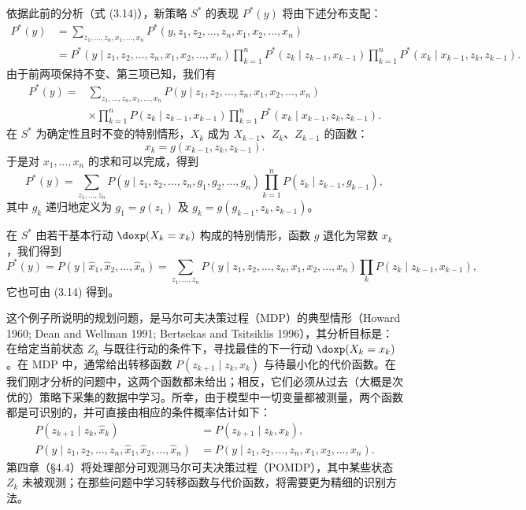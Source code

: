 依据此前的分析（式 \textup{(3.14)}），新策略 $S^*$ 的表现 $P^*(y)$ 将由下述分布支配：
\begin{equation}
\begin{aligned}
P^*(y) &= \sum_{z_1,\dots,z_n,x_1,\dots,x_n} P^*(y,z_1,z_2,\dots,z_n,x_1,x_2,\dots,x_n)\\
&= P^*(y\mid z_1,z_2,\dots,z_n,x_1,x_2,\dots,x_n)\prod_{k=1}^{n}P^*(z_k\mid z_{k-1},x_{k-1})\prod_{k=1}^{n}P^*(x_k\mid x_{k-1},z_k,z_{k-1}).
\end{aligned} \tag{3.15}
\end{equation}
由于前两项保持不变、第三项已知，我们有
\begin{equation}
\begin{aligned}
P^*(y) = {}& \sum_{z_1,\dots,z_n,x_1,\dots,x_n} P(y\mid z_1,z_2,\dots,z_n,x_1,x_2,\dots,x_n)\\
&\times \prod_{k=1}^{n}P(z_k\mid z_{k-1},x_{k-1})\prod_{k=1}^{n}P^*(x_k\mid x_{k-1},z_k,z_{k-1}).
\end{aligned} \tag{3.16}
\end{equation}
在 $S^*$ 为确定性且时不变的特别情形，$X_k$ 成为 $X_{k-1}$、$Z_k$、$Z_{k-1}$ 的函数：
\[
x_k = g(x_{k-1},z_k,z_{k-1}).
\]
于是对 $x_1,\dots,x_n$ 的求和可以完成，得到
\begin{equation}
P^*(y) = \sum_{z_1,\dots,z_n} P(y\mid z_1,z_2,\dots,z_n,g_1,g_2,\dots,g_n)\prod_{k=1}^{n}P(z_k\mid z_{k-1},g_{k-1}), \tag{3.17}
\end{equation}
其中 $g_k$ 递归地定义为 $g_1=g(z_1)$ 及 $g_k=g(g_{k-1},z_k,z_{k-1})$。

在 $S^*$ 由若干基本行动 $\doxp(X_k=x_k)$ 构成的特别情形，函数 $g$ 退化为常数 $x_k$，我们得到
\begin{equation}
P^*(y) = P(y\mid\hat{x}_1,\hat{x}_2,\dots,\hat{x}_n) = \sum_{z_1,\dots,z_n} P(y\mid z_1,z_2,\dots,z_n,x_1,x_2,\dots,x_n)\prod_{k}P(z_k\mid z_{k-1},x_{k-1}), \tag{3.18}
\end{equation}
它也可由 \textup{(3.14)} 得到。

这个例子所说明的规划问题，是马尔可夫决策过程（MDP）的典型情形（Howard 1960; Dean and Wellman 1991; Bertsekas and Tsitsiklis 1996），其分析目标是：在给定当前状态 $Z_k$ 与既往行动的条件下，寻找最佳的下一行动 $\doxp(X_k=x_k)$。在 MDP 中，通常给出转移函数 $P(z_{k+1}\mid z_k,x_k)$ 与待最小化的代价函数。在我们刚才分析的问题中，这两个函数都未给出；相反，它们必须从过去（大概是次优的）策略下采集的数据中学习。所幸，由于模型中一切变量都被测量，两个函数都是可识别的，并可直接由相应的条件概率估计如下：
\[
\begin{aligned}
P(z_{k+1}\mid z_k,\hat{x}_k) &= P(z_{k+1}\mid z_k,x_k),\\
P(y\mid z_1,z_2,\dots,z_n,\hat{x}_1,\hat{x}_2,\dots,\hat{x}_n) &= P(y\mid z_1,z_2,\dots,z_n,x_1,x_2,\dots,x_n).
\end{aligned}
\]
第四章（\S 4.4）将处理部分可观测马尔可夫决策过程（POMDP），其中某些状态 $Z_k$ 未被观测；在那些问题中学习转移函数与代价函数，将需要更为精细的识别方法。

